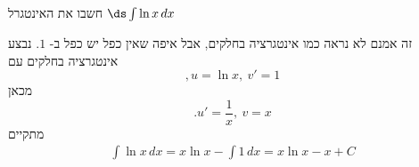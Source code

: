 חשבו את האינטגרל
$\ds \int\ln x \, dx$
\begin{solbox}
זה אמנם לא נראה כמו אינטגרציה בחלקים, אבל איפה שאין כפל יש כפל ב-
$1$.
נבצע אינטגרציה בחלקים עם $$,u=\ln x,\ v'=1$$
מכאן
$$.u'=\frac{1}{x},\ v= x$$
מתקיים
\begin{align*}
\int \ln x\,dx=x\ln x-\int 1\,dx=x\ln x-x+C
\end{align*}
\end{solbox}
